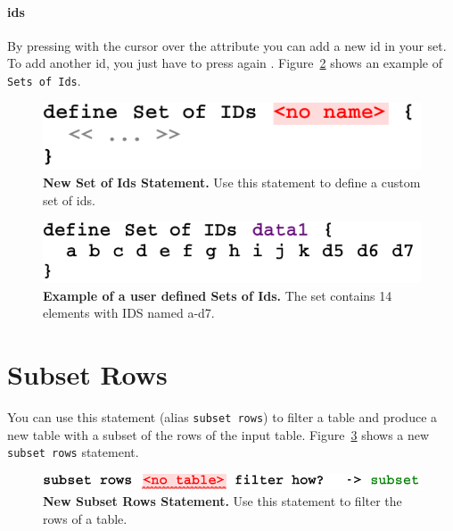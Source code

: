 \paragraph{ids}
By pressing \keys{\return} with the cursor over the \mpsplaceholder{} attribute you can add a new id in your set. To add another id, you just have to press again \keys{\return}. Figure~\ref{fig:ExampleSetOfIds} shows an example of \texttt{Sets of Ids}.

\begin{figure}
  \centering
  \includegraphics[width=\figWidthSmall]{figures/NewSetsOfIds.pdf}
\caption[New Sets of Ids.]{\textbf{New Set of Ids Statement.} Use this statement to define a custom set of ids.}
\label{fig:NewSetsOfIds}
\end{figure}

\begin{figure}
  \centering
  \includegraphics[width=\figWidthSmall]{figures/ExampleSetOfIds.pdf}
\caption[Example of a user defined Sets of Ids.]{\textbf{Example of a user defined Sets of Ids.} The set contains 14 elements with IDS named a-d7.}
\label{fig:ExampleSetOfIds}
\end{figure}


\section{Subset Rows}\label{sec:subsetStatement}
You can use this statement (alias \texttt{subset rows}) to filter a table and produce a new table with a subset of the rows of the input table. Figure~\ref{fig:NewSubsetRows} shows a new \texttt{subset rows} statement.

\begin{figure}
  \centering
  \includegraphics[width=\figWidthNarrow]{figures/NewSubsetRowsStatement.pdf}
\caption[New Subset Rows Statement.]{\textbf{New Subset Rows Statement.} Use this statement to filter the rows of a table.}
\label{fig:NewSubsetRows}
\end{figure}

